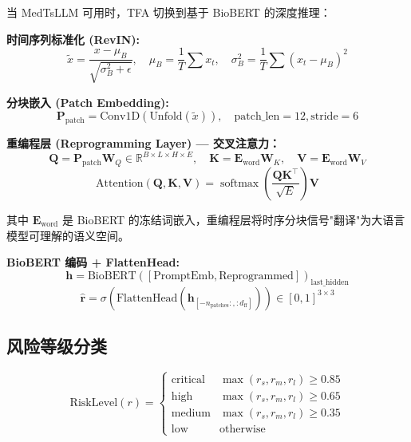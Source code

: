 \documentclass[11pt,a4paper]{ctexart}
\theoremstyle{remark}
\DeclareMathOperator{\softmax}{softmax}
\begin{document}
当 MedTsLLM 可用时，TFA 切换到基于 BioBERT 的深度推理：

\textbf{时间序列标准化 (RevIN):}
\begin{equation}
\tilde{x} = \frac{x - \mu_B}{\sqrt{\sigma_B^2 + \epsilon}}, \quad \mu_B = \frac{1}{T}\sum x_t, \quad \sigma_B^2 = \frac{1}{T}\sum(x_t - \mu_B)^2
\end{equation}

\textbf{分块嵌入 (Patch Embedding):}
\begin{equation}
\mathbf{P}_{\text{patch}} = \text{Conv1D}(\text{Unfold}(\tilde{x})), \quad \text{patch\_len}=12, \text{stride}=6
\end{equation}

\textbf{重编程层 (Reprogramming Layer) — 交叉注意力：}
\begin{equation}
\mathbf{Q} = \mathbf{P}_{\text{patch}} \mathbf{W}_Q \in \mathbb{R}^{B \times L \times H \times E}, \quad
\mathbf{K} = \mathbf{E}_{\text{word}} \mathbf{W}_K, \quad
\mathbf{V} = \mathbf{E}_{\text{word}} \mathbf{W}_V
\end{equation}
\begin{equation}
\text{Attention}(\mathbf{Q}, \mathbf{K}, \mathbf{V}) = \softmax\left(\frac{\mathbf{Q}\mathbf{K}^{\top}}{\sqrt{E}}\right) \mathbf{V}
\end{equation}

其中 $\mathbf{E}_{\text{word}}$ 是 BioBERT 的冻结词嵌入，重编程层将时序分块信号"翻译"为大语言模型可理解的语义空间。

\textbf{BioBERT 编码 + FlattenHead:}
\begin{equation}
\mathbf{h} = \text{BioBERT}\left([\text{PromptEmb}, \text{Reprogrammed}]\right)_{\text{last\_hidden}}
\end{equation}
\begin{equation}
\hat{\mathbf{r}} = \sigma\left(\text{FlattenHead}(\mathbf{h}_{[-n_{\text{patches}}:, :d_{\text{ff}}]})\right) \in [0,1]^{3 \times 3}
\end{equation}

\subsection{风险等级分类}

\begin{equation}
\text{RiskLevel}(r) =
\begin{cases}
\text{critical} & \max(r_s, r_m, r_l) \geq 0.85 \\
\text{high} & \max(r_s, r_m, r_l) \geq 0.65 \\
\text{medium} & \max(r_s, r_m, r_l) \geq 0.35 \\
\text{low} & \text{otherwise}
\end{cases}
\end{equation}
\end{document}
